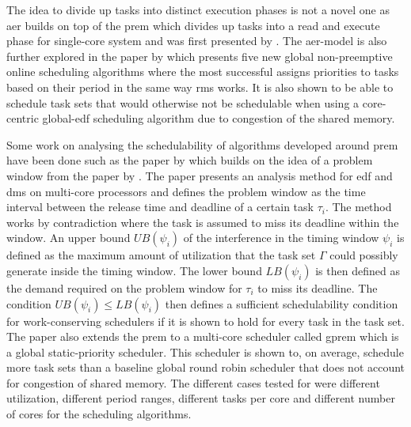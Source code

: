 \documentclass{kththesis}
\begin{document}
The idea to divide up tasks into distinct execution phases is not a novel one as \acrshort{aer}
builds on top of the \acrshort{prem} which divides up tasks into a read and execute phase for
single-core system and was first presented by \textcite{pellizzoni_predictable_2011}. The
\acrshort{aer}-model is also further explored in the paper by \textcite{maia_closer_2016} which presents five
new global non-preemptive online scheduling algorithms where the most successful assigns priorities
to tasks based on their period in the same way \acrshort{rms} works. It is also shown to be able to
schedule task sets that would otherwise not be schedulable when using a core-centric
global-\acrshort{edf} scheduling algorithm due to congestion of the shared memory.

Some work on analysing the schedulability of algorithms developed around
\acrshort{prem} have been done such as the paper by \textcite{alhammad_schedulability_2014} which builds on the idea of a
problem window from the paper by \textcite{baker_multiprocessor_2003}. The paper presents an analysis method for
\acrshort{edf} and \acrfull{dms} on multi-core processors and defines the problem window as the
time interval between the release time and deadline of a certain task $ \tau_i $. The method works
by contradiction where the task is assumed to miss its deadline within the window. An upper bound $
UB(\psi_i) $ of the interference in the timing window $ \psi_i $ is defined as the maximum amount of
utilization that the task set $ \Gamma $ could possibly generate inside the timing window. The lower
bound $ LB(\psi_i) $ is then defined as the demand required on the problem window for $ \tau_i $ to
miss its deadline. The condition $ UB(\psi_i) \le LB(\psi_i) $ then defines a sufficient
schedulability condition for work-conserving schedulers if it is shown to hold for every task in the
task set. The paper also extends the \acrshort{prem} to a multi-core scheduler called
\acrshort{gprem} which is a global static-priority scheduler. This scheduler is shown to, on
average, schedule more task sets than a baseline global round robin scheduler that does not account
for congestion of shared memory. The different cases tested for were different utilization, different period ranges,
different tasks per core and different number of cores for the scheduling algorithms.
\end{document}
